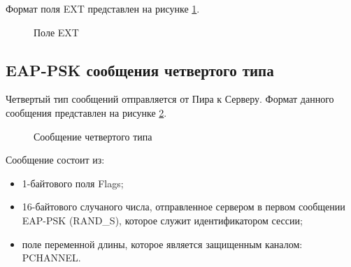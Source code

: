 Формат поля EXT представлен на рисунке \ref{img:ext_field}.

\begin{figure}[h!]
\caption{Поле EXT}
\label{img:ext_field}
\end{figure}

\subsection{EAP-PSK сообщения четвертого типа}

Четвертый тип сообщений отправляется от Пира к Серверу. Формат данного сообщения представлен на рисунке \ref{img:message_type4}.

\begin{figure}[h!]
\caption{Сообщение четвертого типа}
\label{img:message_type4}
\end{figure}

Сообщение состоит из:

\begin{itemize}
\item 1-байтового поля Flags;
\item 16-байтового случаного числа, отправленное сервером в первом сообщении EAP-PSK (RAND\_S), которое служит идентификатором сессии;
\item поле переменной длины, которое является защищенным каналом: PCHANNEL.
\end{itemize}

